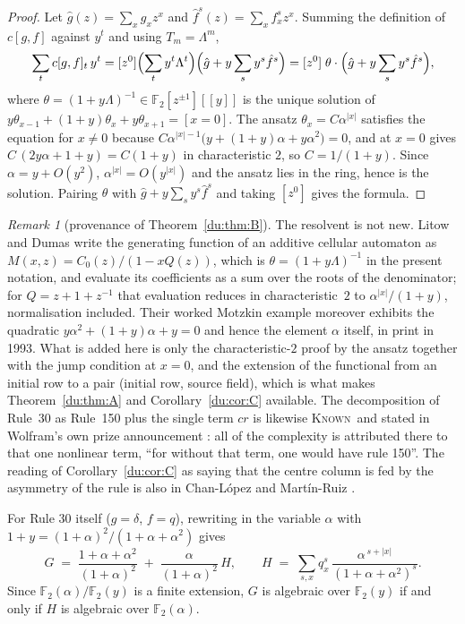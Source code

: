 \documentclass[11pt]{article}
\theoremstyle{definition}
\theoremstyle{remark}
\newtheorem{remark}[theorem]{Remark}
\newcommand{\KNOWN}{\textsc{Known}}
\begin{document}
\begin{proof}
Let $\hat g(z)=\sum_x g_x z^x$ and $\hat f^s(z)=\sum_x f^s_x z^x$. Summing the
definition of $c[g,f]$ against $y^t$ and using $T_m=\Lambda^m$,
\[
  \sum_t c[g,f]_t\,y^t = [z^0]\Bigl(\sum_t y^t\Lambda^t\Bigr)\Bigl(\hat g + y\sum_s y^s \hat f^s\Bigr)
  = [z^0]\;\theta\cdot\Bigl(\hat g + y\sum_s y^s \hat f^s\Bigr),
\]
where $\theta=(1+y\Lambda)^{-1}\in \mathbb F_2[z^{\pm 1}][[y]]$ is the unique solution of
$y\theta_{x-1}+(1+y)\theta_x+y\theta_{x+1}=[x=0]$. The ansatz $\theta_x = C\alpha^{|x|}$
satisfies the equation for $x\neq 0$ because $C\alpha^{|x|-1}\bigl(y+(1+y)\alpha+y\alpha^2\bigr)=0$,
and at $x=0$ gives $C\,(2y\alpha + 1+y) = C(1+y)$ in characteristic $2$, so $C=1/(1+y)$.
Since $\alpha = y + O(y^2)$, $\alpha^{|x|}=O(y^{|x|})$ and the ansatz lies in the ring,
hence is the solution. Pairing $\theta$ with $\hat g + y\sum_s y^s\hat f^s$ and taking $[z^0]$
gives the formula.
\end{proof}

\begin{remark}[provenance of Theorem~\ref{du:thm:B}]\label{du:thm:B:prov}
The resolvent is not new. Litow and Dumas \cite{LD} write the generating function of an additive
cellular automaton as $M(x,z)=C_0(z)/(1-xQ(z))$, which is $\theta=(1+y\Lambda)^{-1}$ in the present
notation, and evaluate its coefficients as a sum over the roots of the denominator; for
$Q=z+1+z^{-1}$ that evaluation reduces in characteristic~$2$ to $\alpha^{|x|}/(1+y)$, normalisation
included. Their worked Motzkin example moreover exhibits the quadratic $y\alpha^2+(1+y)\alpha+y=0$ and
hence the element $\alpha$ itself, in print in 1993. What is added here is only the characteristic-$2$
proof by the ansatz together with the jump condition at $x=0$, and the extension of the functional from
an initial row to a pair (initial row, source field), which is what makes Theorem~\ref{du:thm:A} and
Corollary~\ref{du:cor:C} available. The decomposition of Rule~30 as Rule~150 plus the single term $cr$
is likewise \KNOWN\ and stated in Wolfram's own prize announcement \cite{Wolfram}: all of the
complexity is attributed there to that one nonlinear term, ``for without that term, one would have
rule 150''. The reading of Corollary~\ref{du:cor:C} as saying that the centre column is fed by the
asymmetry of the rule is also in Chan-L\'opez and Mart\'in-Ruiz \cite{CLMR}.
\end{remark}


For Rule 30 itself ($g=\delta$, $f=q$), rewriting in the variable $\alpha$ with
$1+y = (1+\alpha)^2/(1+\alpha+\alpha^2)$ gives
\[
  G \;=\; \frac{1+\alpha+\alpha^2}{(1+\alpha)^2} \;+\; \frac{\alpha}{(1+\alpha)^2}\,H,
  \qquad
  H \;=\; \sum_{s,x} q^s_x\,\frac{\alpha^{\,s+|x|}}{(1+\alpha+\alpha^2)^{s}} .
\]
Since $\mathbb F_2(\alpha)/\mathbb F_2(y)$ is a finite extension, $G$ is algebraic over
$\mathbb F_2(y)$ if and only if $H$ is algebraic over $\mathbb F_2(\alpha)$.
\end{document}

